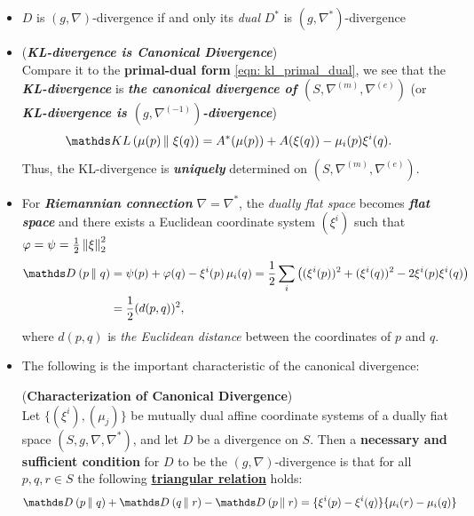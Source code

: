 \documentclass[11pt]{article}
\begin{document}
\begin{itemize}
\item \begin{remark}
$D$ is $(g, \nabla)$-divergence if and only its \emph{dual} $D^{*}$ is $(g, \nabla^{*})$-divergence
\end{remark}

\item \begin{example} (\emph{\textbf{KL-divergence is Canonical Divergence}})\\
Compare it to the \textbf{primal-dual form} \eqref{eqn: kl_primal_dual}, we see that the  \emph{\textbf{KL-divergence}} is \emph{\textbf{the canonical divergence of $(S, \nabla^{(m)}, \nabla^{(e)})$}} (or \emph{\textbf{KL-divergence is $(g, \nabla^{(-1)})$-divergence}})
\begin{align*}
 \kl{\mu(p)}{\xi(q)} &=  A^{*}(\mu(p)) + A(\xi(q)) - \mu_i(p)\xi^{i}(q). 
\end{align*} Thus, the KL-divergence is \emph{\textbf{uniquely}} determined on $(S, \nabla^{(m)}, \nabla^{(e)})$.
\end{example}

\item \begin{remark}
For \emph{\textbf{Riemannian connection}} $\nabla = \nabla^{*}$, the \emph{dually flat space} becomes \emph{\textbf{flat space}} and there exists a Euclidean coordinate system $(\xi^i)$ such that $\varphi = \psi = \frac{1}{2}\left\|\xi\right\|_{2}^2$
\begin{align*}
\divg{}{p}{q} &= \psi(p) + \varphi(q) -  \xi^{i}(p)\,\mu_i(q) = \frac{1}{2}\sum_i\paren{(\xi^i(p))^2 + (\xi^i(q))^2 - 2 \xi^i(p) \xi^{i}(q)} \\
&= \frac{1}{2}(d(p, q))^2,
\end{align*} where $d(p, q)$ is \emph{the Euclidean distance} between the coordinates of $p$ and $q$.
\end{remark}

\item The following is the important characteristic of the canonical divergence:
\begin{theorem} (\textbf{Characterization of Canonical Divergence}) \citep{amari2007methods} \\
Let $\{(\xi^i), (\mu_j)\}$  be mutually dual affine coordinate systems of a dually fiat space $(S, g, \nabla, \nabla^{*})$, and let $D$ be a divergence on $S$. Then a \textbf{necessary and sufficient condition} for $D$ to be the $(g, \nabla)$-divergence is that for all $p, q, r \in S$ the following \underline{\textbf{triangular relation}} holds:
\begin{align}
\divg{}{p}{q} + \divg{}{q}{r} - \divg{}{p}{r} &= \{ \xi^i(p) - \xi^i(q) \}\{\mu_{i}(r) - \mu_{i}(q)\}  \label{eqn: canonical_divg_triangle_equality}
\end{align}
\end{theorem}


\end{itemize}
\end{document}

